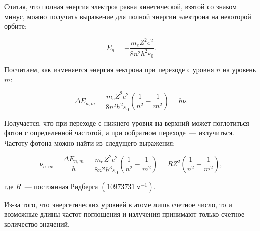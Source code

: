 Считая, что полная энергия электроа равна кинетической, взятой со знаком минус, можно получить выражение для полной энергии электрона на некоторой орбите:

\begin{equation}
	E_n = -\frac{m_e Z^2 e^2}{8 n^2 h^2 \varepsilon_0}.
\end{equation}

Посчитаем, как изменяется энергия эектрона при переходе с уровня $n$ на уровень $m$:

\begin{equation}
	\Delta E_{n, m} = \frac{m_e Z^2 e^2}{8 n^2 h^2 \varepsilon_0} \left( \frac{1}{n^2} - \frac{1}{m^2}\right) = h \nu.
\end{equation}

Получается, что при переходе с нижнего уровня на верхний может поглотиться фотон с определенной частотой, а при ообратном переходе~--- излучиться. Частоту фотона можно найти из следущего выражения:

\begin{equation}
	\nu_{n, m} =
	\frac{\Delta E_{n, m}}{h} = \frac{m_e Z^2 e^2}{8 n^2 h^3 \varepsilon_0} \left( \frac{1}{n^2} - \frac{1}{m^2}\right) = R Z^2 \left(\frac{1}{n^2} - \frac{1}{m^2} \right),
\end{equation}

где $R$~--- постоянная Ридберга $(10973731~\text{м}^{-1})$.

Из-за того, что энергетических уровней в атоме лишь счетное число, то и возможные длины частот поглощения и излучения принимают только счетное количество значений.

